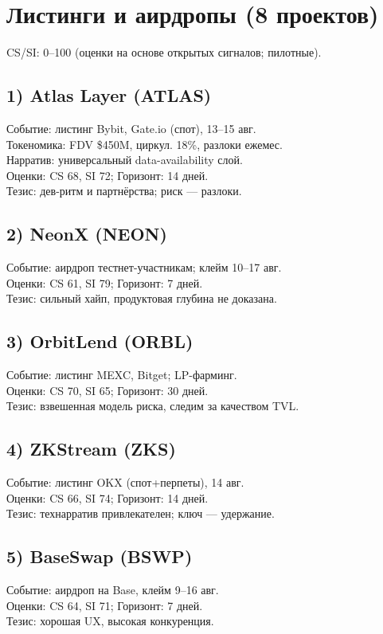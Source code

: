 \documentclass[12pt,a4paper]{article}
\begin{document}
\section*{Листинги и аирдропы (8 проектов)}
CS/SI: 0--100 (оценки на основе открытых сигналов; пилотные).

\subsection*{1) Atlas Layer (ATLAS)}
Событие: листинг Bybit, Gate.io (спот), 13--15 авг.\\
Токеномика: FDV \$450M, циркул. 18\%, разлоки ежемес.\\
Нарратив: универсальный data-availability слой.\\
Оценки: CS 68, SI 72; Горизонт: 14 дней.\\
Тезис: дев-ритм и партнёрства; риск --- разлоки.

\subsection*{2) NeonX (NEON)}
Событие: аирдроп тестнет-участникам; клейм 10--17 авг.\\
Оценки: CS 61, SI 79; Горизонт: 7 дней.\\
Тезис: сильный хайп, продуктовая глубина не доказана.

\subsection*{3) OrbitLend (ORBL)}
Событие: листинг MEXC, Bitget; LP-фарминг.\\
Оценки: CS 70, SI 65; Горизонт: 30 дней.\\
Тезис: взвешенная модель риска, следим за качеством TVL.

\subsection*{4) ZKStream (ZKS)}
Событие: листинг OKX (спот+перпеты), 14 авг.\\
Оценки: CS 66, SI 74; Горизонт: 14 дней.\\
Тезис: технарратив привлекателен; ключ --- удержание.

\subsection*{5) BaseSwap (BSWP)}
Событие: аирдроп на Base, клейм 9--16 авг.\\
Оценки: CS 64, SI 71; Горизонт: 7 дней.\\
Тезис: хорошая UX, высокая конкуренция.
\end{document}
